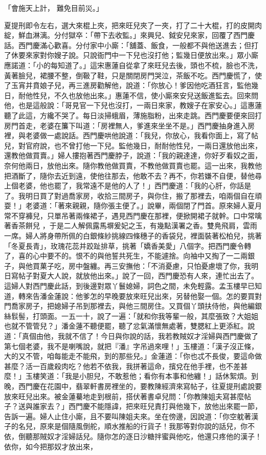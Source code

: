 「會施天上計，  難免目前災。」

夏提刑即令左右，選大來棍上夾，把來旺兒夾了一夾，打了二十大棍，打的皮開肉綻，鮮血淋漓。分付獄卒：「帶下去收監。」來興兒、鉞安兒來家，回覆了西門慶話。西門慶滿心歡喜。分付家中小廝：「舖蓋、飯食，一般都不與他送進去；但打了休要來家對你嫂子說。只說衙門中一下兒也沒打他；監幾日便放出來。」眾小廝應諾道：「小的每知道了。」這宋惠蓮自從拿了來旺兒去後，頭也不梳，臉也不洗，黃著臉兒，裙腰不整，倒靸了鞋，只是關閉房門哭泣，茶飯不吃。西門慶慌了，使了玉宵并賁娘子兒，再三進房勸解他，說道：「你放心！爹因他吃酒狂言，監他幾日，耐他性兒，不久也放他出來。」惠蓮不信，使小廝來安兒送飯進監去。回來問他，也是這般說：「哥見官一下兒也沒打，一兩日來家，教嫂子在家安心。」這惠蓮聽了此這，方纔不哭了。每日淡掃蛾眉，薄施脂粉，出來走跳。西門慶要便來回打房門首走，老婆在簾下叫道：「房裡無人，爹進來坐坐不是。」西門慶抽身進入房裡，與老婆做一處說話。西門慶哄他說道：「我兒，你放心，我看你面上，寫了帖兒，對官府說，也不曾打他一下兒。監他幾日，耐耐他性兒，一兩日還放他出來，還教他做買賣。」婦人摟抱著西門慶脖子，說道：「我的親達達，你好歹看奴之面，奈何他兩日，放他出來。隨你教他做買賣，不教他做買賣也罷。這一出來，我教他把酒斷了，隨你去近到遠，使他往那去，他敢不去？再不，你若嫌不自便，替他尋上個老婆，他也罷了，我常遠不是他的人了！」西門慶道：「我的心肝，你話是了。我明日買了對過喬家房，收拾三間房子，與你住，搬了那裡去，咱兩個自在頑耍！」老婆道：「著來親親，隨你張主便了。」說畢，兩個閉了門首。原來婦人夏月常不穿褲兒，只單吊著兩條裙子，遇見西門慶在那裡，便掀開裙子就幹。口中常噙著香茶餅兒 ，于是二人解佩露馬塀爰妃之玉，有幾點漢署之香。雙鳧飛肩，雲雨一席。婦人將身帶所佩的白銀條紗挑線四條穗子的香袋兒，裡面裝著松柏兒，挑著「冬夏長青」，玫瑰花蕊并跤趾排草，挑著「嬌香美愛」八個字。把西門慶令轉了，喜的心中要不的。恨不的與他誓共死生，不能遽捨。向袖中又掏了一二兩銀子，與他買菓子吃，房中盤纏。再三安撫他：「不消憂慮，只怕憂慮壞了你，我明日寫帖子對夏大人說，就放他出來。」說了一回，西門慶恐有人來，連忙出去了。這婦人對西門慶此話，到後邊對眾丫鬟媳婦，詞色之間，未免輕露。孟玉樓早已知道，轉來告潘金蓮說：他爹怎的早晚要放來旺兒出來，另替他娶一個。怎的要買對門喬家房子，把媳婦子吊到那裡去，與他三間房住。又買個丫頭扶侍他，與他編銀絲䯼髻，打頭面。一五一十，說了一遍：「就和你我等輩一般，其麼張致？大姐姐也就不管管兒？」潘金蓮不聽便罷，聽了忿氣滿懷無處著，雙腮紅上更添紅。說道：「真個由他，我就不信了！今日與你說的話，我若教賊奴才淫婦與西門慶做了第七個老婆，我不是喇嘴說，就把『潘』字吊過來哩！」玉樓道：「漢子沒正條，大的又不管，咱每能走不能飛，到的那些兒。」金蓮道：「你也忒不長俊，要這命做甚麼？活一百歲殺肉吃？他若不依我，我拼著這命，擯兌在他手裡，也不差甚麼！」玉樓笑道：「我是小胆兒，不敢惹他；看你有本事和他纏！」話休絮煩。到晚，西門慶在花園中，翡翠軒書房裡坐的，要教陳經濟來寫帖子，往夏提刑處說要放來旺兒出來。被金蓮驀地走到根前，搭伏著書卓兒問：「你教陳姐夫寫甚麼帖子？送與誰家去？」西門慶不能隱諱，把來旺兒責打與他幾下，放他出來罷一節，告訴一遍。婦人止住小廝，且不要叫陳姐夫來。坐在傍邊，因說道：「你空躭著漢子的名兒，原來是個隨風倒舵，順水推船的行貨子！我那等對你說的話兒，你不依，倒聽那賊奴才淫婦話兒。隨你怎的逐日沙糖拌蜜與他吃，他還只疼他的漢子！依你，如今把那奴才放出來，